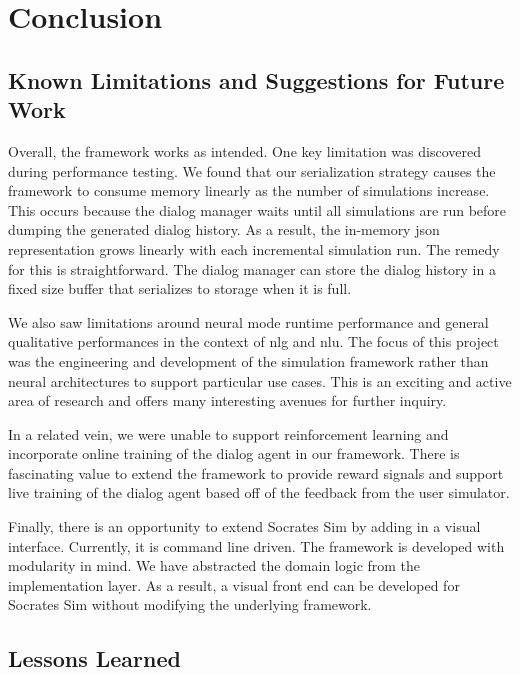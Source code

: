 \chapter{Conclusion}
\label{chap:conclusions}

\section{ Known Limitations and Suggestions for Future Work}
\label{sec:issues} 

Overall, the framework works as intended. One key limitation was discovered during performance testing. We found that our serialization strategy causes the framework to consume memory linearly as the number of simulations increase. This occurs because the dialog manager waits until all simulations are run before dumping the generated dialog history. As a result, the in-memory json representation grows linearly with each incremental simulation run. The remedy for this is straightforward. The dialog manager can store the dialog history in a fixed size buffer that serializes to storage when it is full. 

We also saw limitations around neural mode runtime performance and general qualitative performances in the context of nlg and nlu. The focus of this project was the engineering and development of the simulation framework rather than neural architectures to support particular use cases. This is an exciting and active area of research and offers many interesting avenues for further inquiry.

In a related vein, we were unable to support reinforcement learning and incorporate online training of the dialog agent in our framework. There is fascinating value to extend the framework to provide reward signals and support live training of the dialog agent based off of the feedback from the user simulator. 

Finally, there is an opportunity to extend Socrates Sim by adding in a visual interface. Currently, it is command line driven. The framework is developed with modularity in mind. We have abstracted the domain logic from the implementation layer. As a result, a visual front end can be developed for Socrates Sim without modifying the underlying framework.

\section{Lessons Learned}
\label{sec:lessons}

